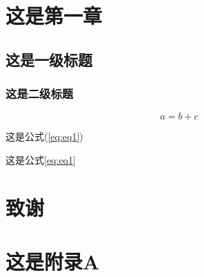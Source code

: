 \documentclass[master]{cugthesis}
\begin{document}
\makefrontpages
\chapter{这是第一章}
\section{这是一级标题}
\subsection{这是二级标题}

\begin{equation}
    a = b+c
    \label{eq:eq1}
\end{equation}

这是公式(\ref{eq:eq1})

这是公式\eqref{eq:eq1}


\backmatter
\chapter{致谢}

\appendix
\chapter{这是附录A}
\end{document}
